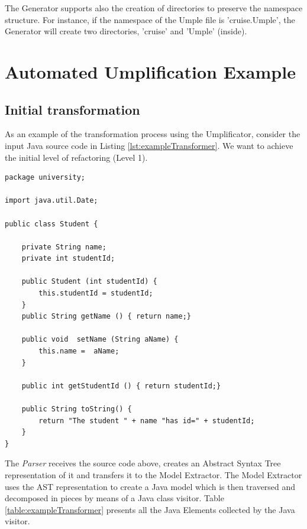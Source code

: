 The Generator supports also the creation of directories to preserve the namespace structure. For instance, if the namespace of the Umple file is 'cruise.Umple', the Generator will create two directories, 'cruise' and 'Umple' (inside).

\section{Automated Umplification Example}
\label{sec:automatedUmplification}
\subsection{Initial transformation}

As an example of the transformation process using the Umplificator, consider the input Java source code in Listing \ref{lst:exampleTransformer}.
We want to achieve the initial level of refactoring (Level 1).

\begin{lstlisting}[style=java, caption=Input source code, label=lst:exampleTransformer]
package university;

import java.util.Date;

public class Student {
	
    private String name;
    private int studentId;
    
    public Student (int studentId) {
    	this.studentId = studentId;
    }
    public String getName () { return name;}
    
    public void  setName (String aName) { 
    	this.name =  aName;
    }
   
    public int getStudentId () { return studentId;}
    
    public String toString() {
    	return "The student " + name "has id=" + studentId;
    }
}   
\end{lstlisting}

The \textit{Parser} receives the source code above, creates an Abstract Syntax Tree representation of it and transfers it to the Model Extractor. The Model Extractor uses the AST representation to create a Java model which is then traversed and decomposed in pieces by means of a Java class visitor. Table \ref{table:exampleTransformer} presents all the Java Elements collected by the Java visitor.

